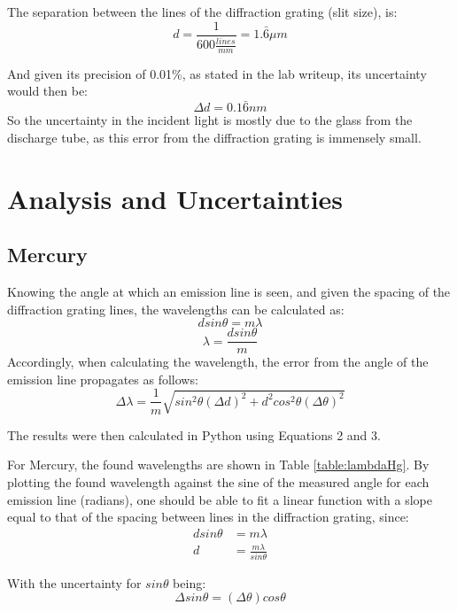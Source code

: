 \documentclass[a4paper, twocolumn]{article}
\begin{document}
The separation between the lines of the diffraction grating (slit size), is:
\begin{equation*}
 d = \frac{1}{600 \frac{lines}{mm}} = 1.\bar{6} \mu m
\end{equation*}

And given its precision of 0.01\%, as stated in the lab writeup, its uncertainty would then be:
\begin{equation*}
 \Delta d = 0.1\bar{6} nm
\end{equation*}
So the uncertainty in the incident light is mostly due to the glass from the discharge tube, as this error from the diffraction grating is
immensely small.

\section{Analysis and Uncertainties}
\subsection{Mercury}
Knowing the angle at which an emission line is seen, and given the spacing of the diffraction grating lines, the
wavelengths can be calculated as:
\begin{equation*}
 dsin\theta = m\lambda
\end{equation*}
\begin{equation}
 \lambda = \frac{dsin\theta}{m}
\end{equation}
Accordingly, when calculating the wavelength, the error from the angle of the emission line propagates as follows:
\begin{equation}
 \Delta\lambda = \frac{1}{m} \sqrt{ sin^2\theta (\Delta d)^2 + d^2 cos^2\theta (\Delta\theta)^2 }
\end{equation}

The results were then calculated in Python using Equations 2 and 3.

For Mercury, the found wavelengths are shown in Table \ref{table:lambdaHg}. By plotting the found wavelength against
the sine of the measured angle for each emission line (radians), one should be able to fit a linear function with a slope
equal to that of the spacing between lines in the diffraction grating, since:
\begin{align*}
 dsin\theta &= m\lambda \\
 d &= \frac{m\lambda}{sin\theta}
\end{align*}

With the uncertainty for $sin\theta$ being:
\begin{equation*}
 \Delta sin\theta = (\Delta\theta) cos\theta
\end{equation*}
\end{document}
